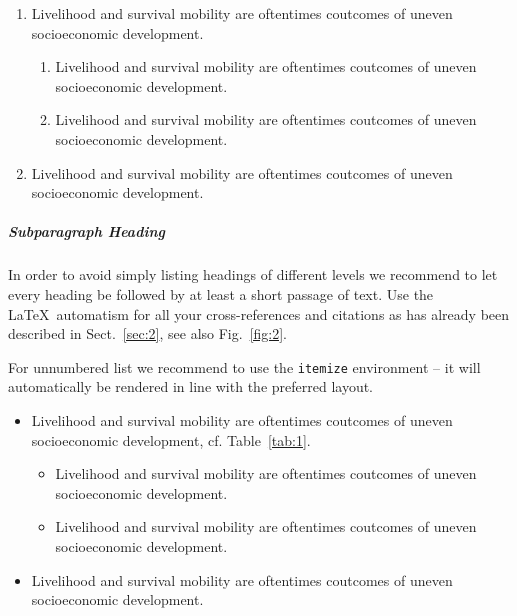 \documentclass[graybox]{svmult}
\begin{document}
\begin{enumerate}
\item{Livelihood and survival mobility are oftentimes coutcomes of uneven socioeconomic development.}
\begin{enumerate}
\item{Livelihood and survival mobility are oftentimes coutcomes of uneven socioeconomic development.}
\item{Livelihood and survival mobility are oftentimes coutcomes of uneven socioeconomic development.}
\end{enumerate}
\item{Livelihood and survival mobility are oftentimes coutcomes of uneven socioeconomic development.}
\end{enumerate}


\subparagraph{Subparagraph Heading} In order to avoid simply listing headings of different levels we recommend to let every heading be followed by at least a short passage of text. Use the \LaTeX\ automatism for all your cross-references and citations as has already been described in Sect.~\ref{sec:2}, see also Fig.~\ref{fig:2}.

For unnumbered list we recommend to use the \verb|itemize| environment -- it will automatically be rendered in line with the preferred layout.

\begin{itemize}
\item{Livelihood and survival mobility are oftentimes coutcomes of uneven socioeconomic development, cf. Table~\ref{tab:1}.}
\begin{itemize}
\item{Livelihood and survival mobility are oftentimes coutcomes of uneven socioeconomic development.}
\item{Livelihood and survival mobility are oftentimes coutcomes of uneven socioeconomic development.}
\end{itemize}
\item{Livelihood and survival mobility are oftentimes coutcomes of uneven socioeconomic development.}
\end{itemize}
\end{document}
